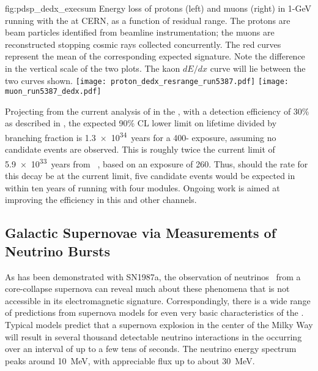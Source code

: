 \begin{dunefigure}{fig:pdsp_dedx_execsum}
{Energy loss of protons (left) and muons (right) in 1-GeV  
running with the   at CERN, as a function of 
residual range.  The protons are beam particles identified from 
beamline instrumentation; the muons are reconstructed stopping 
cosmic rays collected concurrently.  
The red curves represent the mean of the 
corresponding expected signature.  Note the difference in 
the vertical scale of the two plots.  The kaon $dE/dx$ curve 
will lie between the two curves shown.}
\texttt{[image: proton\_dedx\_resrange\_run5387.pdf]}\hspace{0.05\linewidth}
\texttt{[image: muon\_run5387\_dedx.pdf]}
\end{dunefigure}

Projecting from the current analysis of \ptoknubar in the  
, with a detection efficiency of \num{30}\% as 
described in \physchndk, the 
expected 90\% CL lower limit on lifetime divided by branching 
fraction is \SI{1.3e34}{years} for a 
\num{400}-\SI{}{\ktyr} 
exposure, assuming no candidate events are observed.  This 
is roughly twice the current limit of 
\SI{5.9e33}{years} from \superk~\cite{Abe:2014mwa}, 
based on an exposure of \SI{260}{\ktyr}.  Thus, should the rate 
for this decay be at the current \superk limit, five candidate 
events would be expected in  within ten years 
of running with four  modules.  Ongoing work is aimed 
at improving the efficiency in this and other channels.

\subsection{Galactic Supernovae via Measurements of Neutrino Bursts}
\label{sec:es:phys:galact}

As has been demonstrated with SN1987a, the observation 
of neutrinos~\cite{Bionta:1987qt,Hirata:1987hu} from a 
core-collapse supernova can reveal much about these  
phenomena that is not accessible in its  
electromagnetic signature.  Correspondingly, there is a 
wide range of predictions from supernova models for even 
very basic characteristics of the .  Typical  
models predict that a supernova explosion in the 
center of the Milky Way will result in several thousand 
detectable neutrino interactions in the   
occurring over an interval of up to a few tens of seconds.
The neutrino energy spectrum peaks around \SI{10}{\MeV}, 
with appreciable flux up to about \SI{30}{\MeV}.


